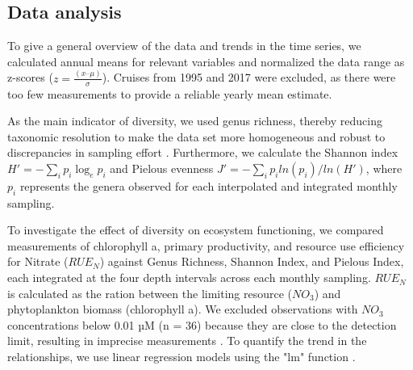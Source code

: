 \documentclass[draft]{agujournal2019}
\begin{document}
    \subsection{Data analysis}    
    To give a general overview of the data and trends in the time series, we calculated annual means for relevant variables and normalized the data range as z-scores ($z = \frac{(x – \mu)}{\sigma}$). Cruises from 1995 and 2017 were excluded, as there were too few measurements to provide a reliable yearly mean estimate. 
    
    As the main indicator of diversity, we used genus richness, thereby reducing taxonomic resolution to make the data set more homogeneous and robust to discrepancies in sampling effort \cite{ptacnik_diversity_2008}. Furthermore, we calculate the Shannon index $H' = -\sum_i p_i \log_{e} p_i$ and Pielou\textquotesingle s evenness $J' = -\sum_i p_i ln( p_i )/ln(H')$, where $p_i$ represents the genera observed for each interpolated and integrated monthly sampling. 

    To investigate the effect of diversity on ecosystem functioning, we compared measurements of chlorophyll a, primary productivity, and resource use efficiency for Nitrate ($RUE_N$) against Genus Richness, Shannon Index, and Pielou\textquotesingle s Index, each integrated at the four depth intervals across each monthly sampling. $RUE_N$ is calculated as the ration between the limiting resource ($NO_3$) and phytoplankton biomass (chlorophyll a).
    We excluded observations with $NO_3$ concentrations below 0.01 µM (n = 36) because they are close to the detection limit, resulting in imprecise measurements \cite{ptacnik_diversity_2008}.
    To quantify the trend in the relationships, we use linear regression models using the "lm" function \cite{r_core_team_r_2024}.
      
\end{document}
